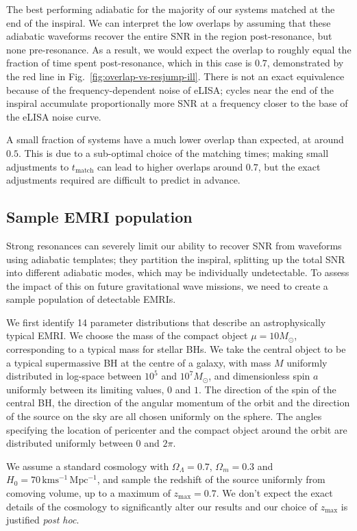 \documentclass[aps,prd,amsfonts,amssymb,amsmath,nofootinbib,reprint,showpacs]{revtex4}
\newcommand{\figref}[1]{Fig.\ \ref{fig:#1}}
\begin{document}
The best performing adiabatic for the majority of our systems matched at the end of the inspiral. We can interpret the low overlaps by assuming that these adiabatic waveforms recover the entire SNR in the region post-resonance, but none pre-resonance. As a result, we would expect the overlap to roughly equal the fraction of time spent post-resonance, which in this case is $0.7$, demonstrated by the red line in \figref{overlap-vs-resjump-ill}. There is not an exact equivalence because of the frequency-dependent noise of eLISA; cycles near the end of the inspiral accumulate proportionally more SNR at a frequency closer to the base of the eLISA noise curve.

A small fraction of systems have a much lower overlap than expected, at around $0.5$. This is due to a sub-optimal choice of the matching times; making small adjustments to $t_\mathrm{match}$ can lead to higher overlaps around $0.7$, but the exact adjustments required are difficult to predict in advance.


\subsection{Sample EMRI population}

Strong resonances can severely limit our ability to recover SNR from waveforms using adiabatic templates; they partition the inspiral, splitting up the total SNR into different adiabatic modes, which may be individually undetectable. To assess the impact of this on future gravitational wave missions, we need to create a sample population of detectable EMRIs.

We first identify 14 parameter distributions that describe an astrophysically typical EMRI. We choose the mass of the compact object $\mu = 10 M_\odot$, corresponding to a typical mass for stellar BHs. We take the central object to be a typical supermassive BH at the centre of a galaxy, with mass $M$ uniformly distributed in log-space between $10^5$ and $10^7 M_\odot$, and dimensionless spin $a$ uniformly between its limiting values, $0$ and $1$. The direction of the spin of the central BH, the direction of the angular momentum of the orbit and the direction of the source on the sky are all chosen uniformly on the sphere. The angles specifying the location of pericenter and the compact object around the orbit are distributed uniformly between $0$ and $2\pi$.

We assume a standard cosmology with $\Omega_\Lambda = 0.7$, $\Omega_m = 0.3$ and $H_0 = 70\,\mathrm{km s^{-1}\, Mpc^{-1}}$, and sample the redshift of the source uniformly from comoving volume, up to a maximum of $z_\mathrm{max} = 0.7$. We don't expect the exact details of the cosmology to significantly alter our results and our choice of $z_\mathrm{max}$ is justified \textit{post hoc}.
\end{document}

